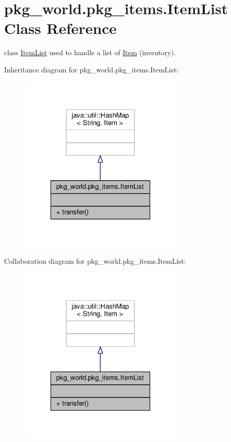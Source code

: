 \hypertarget{classpkg__world_1_1pkg__items_1_1ItemList}{\section{pkg\-\_\-world.\-pkg\-\_\-items.\-Item\-List Class Reference}
\label{classpkg__world_1_1pkg__items_1_1ItemList}
}


class \hyperlink{classpkg__world_1_1pkg__items_1_1ItemList}{Item\-List} used to handle a list of \hyperlink{classpkg__world_1_1pkg__items_1_1Item}{Item} (inventory).  




Inheritance diagram for pkg\-\_\-world.\-pkg\-\_\-items.\-Item\-List\-:\nopagebreak
\begin{figure}[H]
\begin{center}
\leavevmode
\includegraphics[width=226pt]{classpkg__world_1_1pkg__items_1_1ItemList__inherit__graph}
\end{center}
\end{figure}


Collaboration diagram for pkg\-\_\-world.\-pkg\-\_\-items.\-Item\-List\-:\nopagebreak
\begin{figure}[H]
\begin{center}
\leavevmode
\includegraphics[width=226pt]{classpkg__world_1_1pkg__items_1_1ItemList__coll__graph}
\end{center}
\end{figure}
